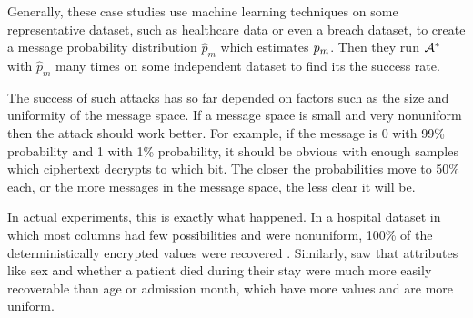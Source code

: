 Generally, these case studies use machine learning techniques on some representative dataset, such as healthcare data or even a breach dataset, to create a message probability distribution $\hat p_m$ which estimates $p_m$. Then they run ${\mathcal A}^*$ with $\hat p_m$ many times on some independent dataset to find its the success rate.

The success of such attacks has so far depended on factors such as the size and uniformity of the message space. If a message space is small and very nonuniform then the attack should work better. For example, if the message is 0 with 99\% probability and 1 with 1\% probability, it should be obvious with enough samples which ciphertext decrypts to which bit. The closer the probabilities move to 50\% each, or the more messages in the message space, the less clear it will be.

In actual experiments, this is exactly what happened. In a hospital dataset in which most columns had few possibilities and were nonuniform, 100\% of the deterministically encrypted values were recovered \cite{Bindschaelder2018tao}. Similarly, \cite{Naveed2015inference} saw that attributes like sex and whether a patient died during their stay were much more easily recoverable than age or admission month, which have more values and are more uniform.



		
		


